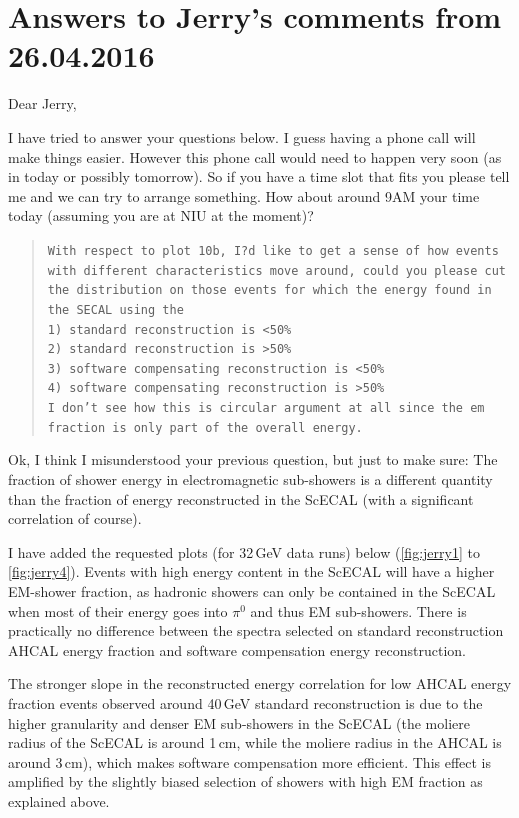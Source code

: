 \documentclass[twoside,a4paper,12pt]{article}
\begin{document}




\section*{Answers to Jerry's comments from 26.04.2016}
Dear Jerry,

I have tried to answer your questions below. I guess having a phone call will make things easier. However this phone call would need to happen very soon (as in today or possibly tomorrow). So if you have a time slot that fits you please tell me and we can try to arrange something. How about around 9AM your time today (assuming you are at NIU at the moment)?


\begin{quote}\texttt{With respect to plot 10b, I?d like to get a sense of how events with different characteristics move around, could you please cut the distribution on those events for which the energy found in the SECAL using the\\ 
1) standard reconstruction is <50\% \\
2) standard reconstruction is >50\%  \\
3) software compensating reconstruction is <50\% \\
4) software compensating reconstruction is >50\% \\
I don't see how this is circular argument at all since the em fraction is only part of the overall energy.}\end{quote}
Ok, I think I misunderstood your previous question, but just to make sure: The fraction of shower energy in electromagnetic sub-showers is a different quantity than the fraction of energy reconstructed in the ScECAL (with a significant correlation of course).

I have added the requested plots (for 32\,GeV data runs) below (\autoref{fig:jerry1} to \ref{fig:jerry4}). Events with high energy content in the ScECAL will have a higher EM-shower fraction, as hadronic showers can only be contained in the ScECAL when most of their energy goes into $\pi^0$ and thus EM sub-showers. There is practically no difference between the spectra selected on standard reconstruction AHCAL energy fraction and software compensation energy reconstruction. 

The stronger slope in the reconstructed energy correlation for low AHCAL energy fraction events observed around 40\,GeV standard reconstruction is due to the higher granularity and denser EM sub-showers in the ScECAL (the moliere radius of the ScECAL is around 1\,cm, while the moliere radius in the AHCAL is around 3\,cm), which makes software compensation more efficient. This effect is amplified by the slightly biased selection of showers with high EM fraction as explained above.  
\end{document}
